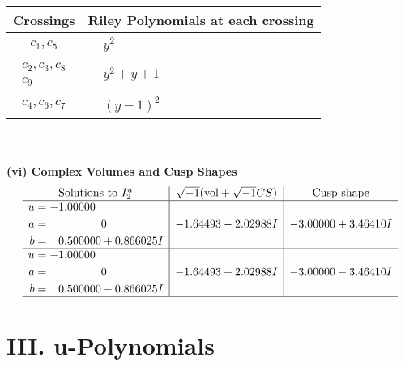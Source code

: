 \documentclass[1p]{elsarticle_modified}
\theoremstyle{definition}
\newcommand{\I}{\sqrt{-1}}
\begin{document}
\begin{tabular}{m{50pt}|m{274pt}}
Crossings & \hspace{64pt}Riley Polynomials at each crossing \\
\hline $$\begin{aligned}c_{1},c_{5}\end{aligned}$$&$\begin{aligned}
&y^2
\end{aligned}$\\
\hline $$\begin{aligned}c_{2},c_{3},c_{8}\\c_{9}\end{aligned}$$&$\begin{aligned}
&y^2+y+1
\end{aligned}$\\
\hline $$\begin{aligned}c_{4},c_{6},c_{7}\end{aligned}$$&$\begin{aligned}
&(y-1)^2
\end{aligned}$\\
\hline
\end{tabular}\\~\\
\newpage\flushleft \textbf{(vi) Complex Volumes and Cusp Shapes}
$$\begin{array}{c|c|c}  
\text{Solutions to }I^u_{2}& \I (\text{vol} + \sqrt{-1}CS) & \text{Cusp shape}\\
 \hline 
\begin{aligned}
u &= -1.00000\phantom{ +0.000000I} \\
a &= \phantom{-0.000000 } 0 \\
b &= \phantom{-}0.500000 + 0.866025 I\end{aligned}
 & -1.64493 - 2.02988 I & -3.00000 + 3.46410 I \\ \hline\begin{aligned}
u &= -1.00000\phantom{ +0.000000I} \\
a &= \phantom{-0.000000 } 0 \\
b &= \phantom{-}0.500000 - 0.866025 I\end{aligned}
 & -1.64493 + 2.02988 I & -3.00000 - 3.46410 I\\
 \hline 
 \end{array}$$\newpage
\newpage\renewcommand{\arraystretch}{1}
\centering \section*{ III. u-Polynomials}
\end{document}
